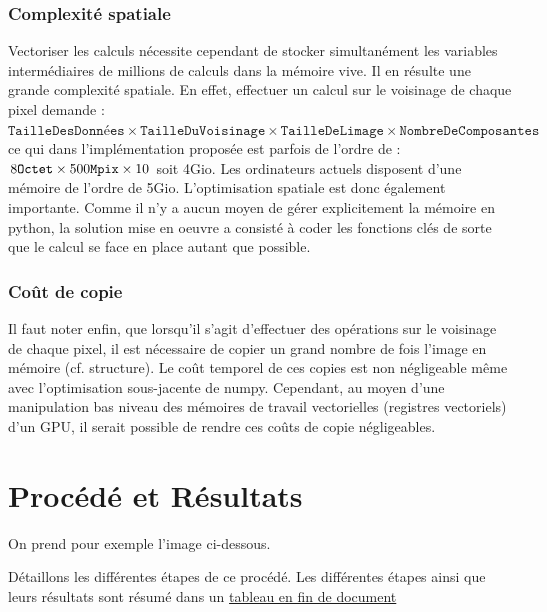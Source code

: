 \documentclass{article}
\begin{document}
\begin{multicols}{2}
\subsubsection{Complexité spatiale}
Vectoriser les calculs nécessite cependant de stocker simultanément les variables intermédiaires de millions de calculs dans la mémoire vive. Il en résulte une grande complexité spatiale. En effet, effectuer un calcul sur le voisinage de chaque pixel demande : $\mathtt{TailleDesDonnées} \times \mathtt{TailleDuVoisinage} \times \mathtt{TailleDeLimage} \times \mathtt{NombreDeComposantes}$ ce qui dans l'implémentation proposée est parfois de l'ordre de :  $8 \mathtt{Octet} \times 500 \time 10 \mathtt{Mpix} \times 10$ soit 4Gio. Les ordinateurs actuels disposent d'une mémoire de l'ordre de 5Gio. L'optimisation spatiale est donc également importante. Comme il n'y a aucun moyen de gérer explicitement la mémoire en python, la solution mise en oeuvre a consisté à coder les fonctions clés de sorte que le calcul se face en place autant que possible.

\subsubsection{Coût de copie}
Il faut noter enfin, que lorsqu'il s'agit d'effectuer des opérations sur le voisinage de chaque pixel, il est nécessaire de copier un grand nombre de fois l'image en mémoire (cf. structure). Le coût temporel de ces copies est non négligeable même avec l'optimisation sous-jacente de numpy. Cependant, au moyen d'une manipulation bas niveau des mémoires de travail vectorielles (registres vectoriels) d'un GPU, il serait possible de rendre ces coûts de copie négligeables.

\section{Procédé et Résultats}

On prend pour exemple l'image ci-dessous.
\begin{figure}
	\centering
\end{figure}
Détaillons les différentes étapes de ce procédé. Les différentes étapes ainsi que leurs résultats sont résumé dans un \hyperref[tab]{tableau en fin de document}


\end{multicols}
\end{document}
